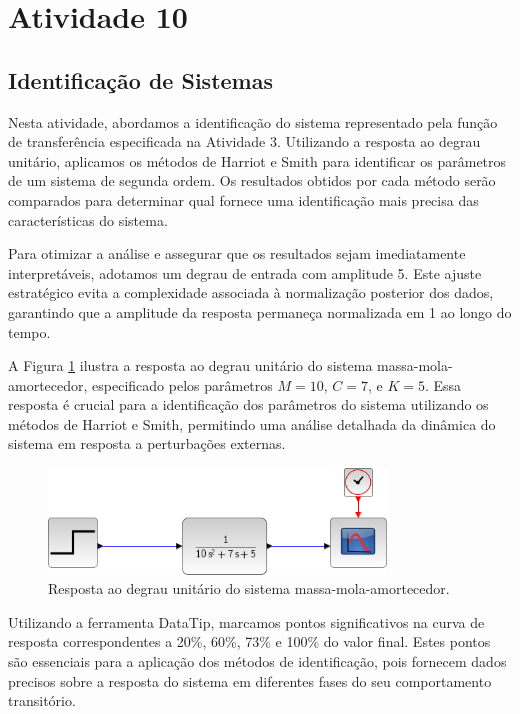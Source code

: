 \section{Atividade 10}

\subsection{Identificação de Sistemas}

Nesta atividade, abordamos a identificação do sistema representado pela função de transferência especificada na Atividade 3. Utilizando a resposta ao degrau unitário, aplicamos os métodos de Harriot e Smith para identificar os parâmetros de um sistema de segunda ordem. Os resultados obtidos por cada método serão comparados para determinar qual fornece uma identificação mais precisa das características do sistema.

Para otimizar a análise e assegurar que os resultados sejam imediatamente interpretáveis, adotamos um degrau de entrada com amplitude 5. Este ajuste estratégico evita a complexidade associada à normalização posterior dos dados, garantindo que a amplitude da resposta permaneça normalizada em 1 ao longo do tempo.

A Figura \ref{fig:diagrama-sistema} ilustra a resposta ao degrau unitário do sistema massa-mola-amortecedor, especificado pelos parâmetros \(M = 10\), \(C = 7\), e \(K = 5\). Essa resposta é crucial para a identificação dos parâmetros do sistema utilizando os métodos de Harriot e Smith, permitindo uma análise detalhada da dinâmica do sistema em resposta a perturbações externas.

\begin{figure}[h]
    \centering
    \includegraphics[width=0.8\textwidth]{atividades/10-atividade/assets/diagrama-sistema.png}
    \caption{Resposta ao degrau unitário do sistema massa-mola-amortecedor.}
    \label{fig:diagrama-sistema}
\end{figure}

Utilizando a ferramenta DataTip, marcamos pontos significativos na curva de resposta correspondentes a 20\%, 60\%, 73\% e 100\% do valor final. Estes pontos são essenciais para a aplicação dos métodos de identificação, pois fornecem dados precisos sobre a resposta do sistema em diferentes fases do seu comportamento transitório.


